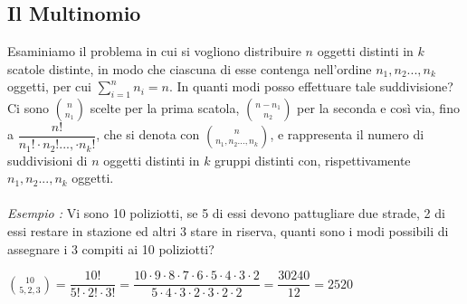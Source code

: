 \documentclass[12pt, letterpaper]{article}
\begin{document}
\subsection{Il Multinomio}
Esaminiamo il problema in cui si vogliono distribuire \(n\) oggetti distinti in \(k\) scatole distinte, in modo che 
ciascuna di esse contenga nell'ordine \(n_1,n_2...,n_k\) oggetti, per cui \(\displaystyle\sum_{i=1}^n n_i =n\). In quanti modi posso 
effettuare tale suddivisione? Ci sono \(\binom{n}{n_1}\) scelte per la prima scatola, \(\binom{n-n_1}{n_2}\) per la seconda 
e così via, fino a \(\dfrac{n!}{n_1!\cdot n_2!...,\cdot n_k!}\), che si denota con \(\displaystyle\binom{n}{n_1,n_2...,n_k}\), e 
rappresenta il numero di suddivisioni di \(n\) oggetti distinti in \(k\) gruppi distinti con, rispettivamente
\(n_1,n_2...,n_k\) oggetti.\\
\hphantom{.}\\\textit{Esempio : }Vi sono 10 poliziotti, se 5 di essi devono pattugliare due strade, 2 di essi 
restare in stazione ed altri 3 stare in riserva, quanti sono i modi possibili di assegnare i 3 compiti ai 
10 poliziotti? \begin{center}
    \(
      \displaystyle\binom{10}{5,2,3}=\dfrac{10!}{5!\cdot2!\cdot3!}=\dfrac{10\cdot9\cdot8\cdot7\cdot6\cdot5\cdot4\cdot3\cdot2}{5\cdot4\cdot3\cdot2\cdot 3 \cdot 2 \cdot 2}=\dfrac{30240}{12}=2520  
    \)
\end{center}
\end{document}

